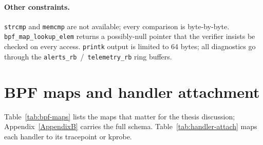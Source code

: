 \paragraph{Other constraints.} \texttt{strcmp} and \texttt{memcmp} are not
available; every comparison is byte-by-byte.
\texttt{bpf\_map\_lookup\_elem} returns a possibly-null pointer that the
verifier insists be checked on every access. \texttt{printk} output is
limited to 64 bytes; all diagnostics go through the
\texttt{alerts\_rb}~/~\texttt{telemetry\_rb} ring buffers.

\section{BPF maps and handler attachment}
\label{sec:maps}

Table~\ref{tab:bpf-maps} lists the maps that matter for the thesis
discussion; Appendix~\ref{AppendixB} carries the full schema.
Table~\ref{tab:handler-attach} maps each handler to its tracepoint or
kprobe.

